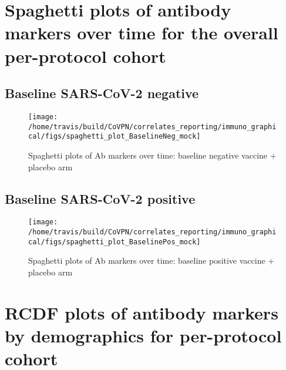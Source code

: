 \documentclass[]{book}
\theoremstyle{definition}
\theoremstyle{definition}
\theoremstyle{definition}
\newcommand{\1}{\mathbbm{1}}
\begin{document}
\hypertarget{spaghetti-plots-of-antibody-markers-over-time-for-the-overall-per-protocol-cohort}{%
\section{Spaghetti plots of antibody markers over time for the overall per-protocol cohort}\label{spaghetti-plots-of-antibody-markers-over-time-for-the-overall-per-protocol-cohort}}

\hypertarget{baseline-sars-cov-2-negative-3}{%
\subsection{Baseline SARS-CoV-2 negative}\label{baseline-sars-cov-2-negative-3}}

\begin{figure}[H]

{\centering \texttt{[image: /home/travis/build/CoVPN/correlates\_reporting/immuno\_graphical/figs/spaghetti\_plot\_BaselineNeg\_mock]} 

}

\caption{Spaghetti plots of Ab markers over time: baseline negative vaccine + placebo arm}\label{fig:unnamed-chunk-53}
\end{figure}

\hypertarget{baseline-sars-cov-2-positive-3}{%
\subsection{Baseline SARS-CoV-2 positive}\label{baseline-sars-cov-2-positive-3}}

\begin{figure}[H]

{\centering \texttt{[image: /home/travis/build/CoVPN/correlates\_reporting/immuno\_graphical/figs/spaghetti\_plot\_BaselinePos\_mock]} 

}

\caption{Spaghetti plots of Ab markers over time: baseline positive vaccine + placebo arm}\label{fig:unnamed-chunk-54}
\end{figure}

\hypertarget{rcdf-plots-of-antibody-markers-by-demographics-for-per-protocol-cohort}{%
\section{RCDF plots of antibody markers by demographics for per-protocol cohort}\label{rcdf-plots-of-antibody-markers-by-demographics-for-per-protocol-cohort}}
\end{document}
